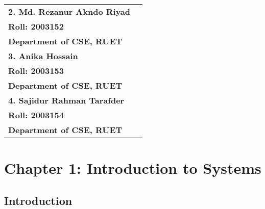 \documentclass[12pt,a4paper]{article}
\begin{document}
\begin{titlepage}
\begin{table}[h!]
\begin{tabular}{|p{7.5cm}|p{7.5cm}|}
        \cline{1-1}
        \large \textbf{2. Md. Rezanur Akndo Riyad} & \\
        \large \quad \textbf{\hspace{0.2cm}Roll: 2003152} & \\
        \large \quad \textbf{\hspace{0.2cm}Department of CSE, RUET} & \\
        \cline{1-1}
        \large \textbf{3. Anika Hossain} & \\
        \large \quad \textbf{\hspace{0.2cm}Roll: 2003153} & \\
        \large \quad \textbf{\hspace{0.2cm}Department of CSE, RUET} & \\
        \cline{1-1}
        \large \textbf{4. Sajidur Rahman Tarafder} & \\
        \large \quad \textbf{\hspace{0.2cm}Roll: 2003154} & \\
        \large \quad \textbf{\hspace{0.2cm}Department of CSE, RUET} & \\
        \hline
        
    \end{tabular}
    \end{table}
    
    \vspace{0.5cm}
\end{titlepage}

\pagestyle{reportstyle}
\newpage

\listoffigures
\newpage

\listoftables
\newpage

\tableofcontents
\newpage


\section{Chapter 1: Introduction to Systems}

\subsection{Introduction}
\end{document}
